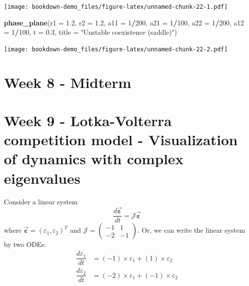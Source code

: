 \documentclass[
]{book}
\newenvironment{Shaded}{\begin{snugshade}}{\end{snugshade}}
\newcommand{\AttributeTok}[1]{\textcolor[rgb]{0.13,0.29,0.53}{#1}}
\newcommand{\DecValTok}[1]{\textcolor[rgb]{0.00,0.00,0.81}{#1}}
\newcommand{\FloatTok}[1]{\textcolor[rgb]{0.00,0.00,0.81}{#1}}
\newcommand{\FunctionTok}[1]{\textcolor[rgb]{0.13,0.29,0.53}{\textbf{#1}}}
\newcommand{\NormalTok}[1]{#1}
\newcommand{\SpecialCharTok}[1]{\textcolor[rgb]{0.81,0.36,0.00}{\textbf{#1}}}
\newcommand{\StringTok}[1]{\textcolor[rgb]{0.31,0.60,0.02}{#1}}
\begin{document}
\texttt{[image: bookdown-demo\_files/figure-latex/unnamed-chunk-22-1.pdf]}

\begin{Shaded}
\begin{Highlighting}[]
  \FunctionTok{phase\_plane}\NormalTok{(}\AttributeTok{r1 =} \FloatTok{1.2}\NormalTok{, }\AttributeTok{r2 =} \FloatTok{1.2}\NormalTok{, }\AttributeTok{a11 =} \DecValTok{1}\SpecialCharTok{/}\DecValTok{200}\NormalTok{, }\AttributeTok{a21 =} \DecValTok{1}\SpecialCharTok{/}\DecValTok{100}\NormalTok{, }\AttributeTok{a22 =} \DecValTok{1}\SpecialCharTok{/}\DecValTok{200}\NormalTok{, }\AttributeTok{a12 =} \DecValTok{1}\SpecialCharTok{/}\DecValTok{100}\NormalTok{, }\AttributeTok{t =} \FloatTok{0.3}\NormalTok{, }\AttributeTok{title =} \StringTok{"Unstable coexistence (saddle)"}\NormalTok{)}
\end{Highlighting}
\end{Shaded}

\texttt{[image: bookdown-demo\_files/figure-latex/unnamed-chunk-22-2.pdf]}

\hypertarget{week-8---midterm}{%
\chapter*{Week 8 - Midterm}\label{week-8---midterm}}

\hypertarget{week-9---lotka-volterra-competition-model---visualization-of-dynamics-with-complex-eigenvalues}{%
\chapter*{Week 9 - Lotka-Volterra competition model - Visualization of dynamics with complex eigenvalues}\label{week-9---lotka-volterra-competition-model---visualization-of-dynamics-with-complex-eigenvalues}}

Consider a linear system
\[
\dfrac{d \vec{\pmb\varepsilon}}{d t} = \mathcal{J}\vec{\pmb\varepsilon}
\]
where \(\vec{\pmb\varepsilon} = (\varepsilon_1, \varepsilon_2)^T\) and \(\mathcal{J} = \begin{pmatrix} -1 & 1\\ -2 & -1 \end{pmatrix}\).
Or, we can write the linear system by two ODEs:
\begin{align*}
  \dfrac{d \varepsilon_1}{d t} &= (-1)\times \varepsilon_1 + (1)\times\varepsilon_2\\
  \dfrac{d \varepsilon_2}{d t} &= (-2)\times \varepsilon_1 + (-1)\times\varepsilon_2\\
\end{align*}
\end{document}
